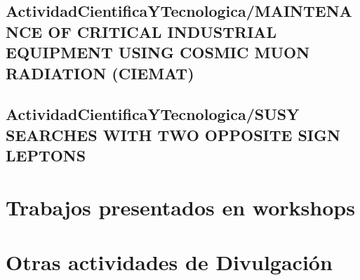 \documentclass[a4paper, 11pt, twoside, openright]{report}
\begin{document}
\subsection{ActividadCientificaYTecnologica/MAINTENANCE OF CRITICAL INDUSTRIAL EQUIPMENT USING COSMIC MUON RADIATION (CIEMAT)}


\subsection{ActividadCientificaYTecnologica/SUSY SEARCHES WITH TWO OPPOSITE SIGN LEPTONS}


\section{Trabajos presentados en workshops}

%

%

%


\section{Otras actividades de Divulgación}
\end{document}

